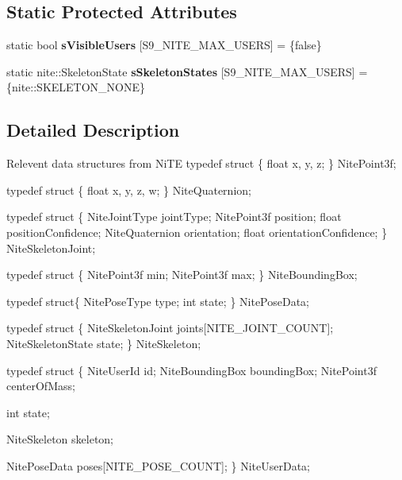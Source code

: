 \subsection*{\-Static \-Protected \-Attributes}
\begin{DoxyCompactItemize}
\item 
\hypertarget{classs9_1_1oni_1_1OpenNISkeleton_af498eae1a18c58a6e85670d319392ca2}{static bool {\bfseries s\-Visible\-Users} \mbox{[}\-S9\-\_\-\-N\-I\-T\-E\-\_\-\-M\-A\-X\-\_\-\-U\-S\-E\-R\-S\mbox{]} = \{false\}}\label{classs9_1_1oni_1_1OpenNISkeleton_af498eae1a18c58a6e85670d319392ca2}

\item 
\hypertarget{classs9_1_1oni_1_1OpenNISkeleton_a25dcf4c455ea86f97b50a10e0a421e38}{static nite\-::\-Skeleton\-State {\bfseries s\-Skeleton\-States} \mbox{[}\-S9\-\_\-\-N\-I\-T\-E\-\_\-\-M\-A\-X\-\_\-\-U\-S\-E\-R\-S\mbox{]} = \{nite\-::\-S\-K\-E\-L\-E\-T\-O\-N\-\_\-\-N\-O\-N\-E\}}\label{classs9_1_1oni_1_1OpenNISkeleton_a25dcf4c455ea86f97b50a10e0a421e38}

\end{DoxyCompactItemize}


\subsection{\-Detailed \-Description}
\-Relevent data structures from \-Ni\-T\-E typedef struct \{ float x, y, z; \} \-Nite\-Point3f;

typedef struct \{ float x, y, z, w; \} \-Nite\-Quaternion;

typedef struct \{ \-Nite\-Joint\-Type joint\-Type; \-Nite\-Point3f position; float position\-Confidence; \-Nite\-Quaternion orientation; float orientation\-Confidence; \} \-Nite\-Skeleton\-Joint;

typedef struct \{ \-Nite\-Point3f min; \-Nite\-Point3f max; \} \-Nite\-Bounding\-Box;

typedef struct\{ \-Nite\-Pose\-Type type; int state; \} \-Nite\-Pose\-Data;

typedef struct \{ \-Nite\-Skeleton\-Joint joints\mbox{[}\-N\-I\-T\-E\-\_\-\-J\-O\-I\-N\-T\-\_\-\-C\-O\-U\-N\-T\mbox{]}; \-Nite\-Skeleton\-State state; \} \-Nite\-Skeleton;

typedef struct \{ \-Nite\-User\-Id id; \-Nite\-Bounding\-Box bounding\-Box; \-Nite\-Point3f center\-Of\-Mass;

int state;

\-Nite\-Skeleton skeleton;

\-Nite\-Pose\-Data poses\mbox{[}\-N\-I\-T\-E\-\_\-\-P\-O\-S\-E\-\_\-\-C\-O\-U\-N\-T\mbox{]}; \} \-Nite\-User\-Data;

